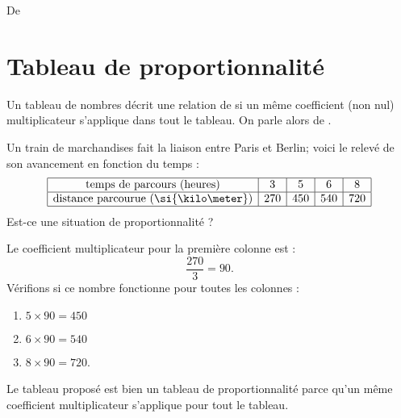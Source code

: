 

De \cite{NRHooXFvgpp5}

\section{Tableau de proportionnalité}

\begin{Aretenir}
    Un tableau de nombres décrit une relation de  si un même coefficient (non nul) multiplicateur s’applique dans tout le tableau. On parle alors de .
\end{Aretenir}

\begin{example}
    Un train de marchandises fait la liaison entre Paris et Berlin; voici le relevé de son avancement en fonction du temps :
    \begin{equation*}
        \begin{array}[]{|c|c|c|c|c|}
            \hline
            \text{temps de parcours (heures)}&3&5&6&8\\
            \hline
            \text{distance parcourue (\si{\kilo\meter})}&270&450&540&720\\
            \hline
        \end{array}
    \end{equation*}
    Est-ce une situation de proportionnalité ?

    Le coefficient multiplicateur pour la première colonne est :
    \begin{equation}
        \frac{ 270 }{ 3 }=90.
    \end{equation}
    Vérifions si ce nombre fonctionne pour toutes les colonnes :
    \begin{enumerate}
        \item
            \( 5\times 90=450\)
        \item
            \( 6\times 90=540\)
        \item
            \( 8\times 90=720\).
    \end{enumerate}
    Le tableau proposé est bien un tableau de proportionnalité parce qu'un même coefficient multiplicateur s'applique pour tout le tableau.
\end{example}



